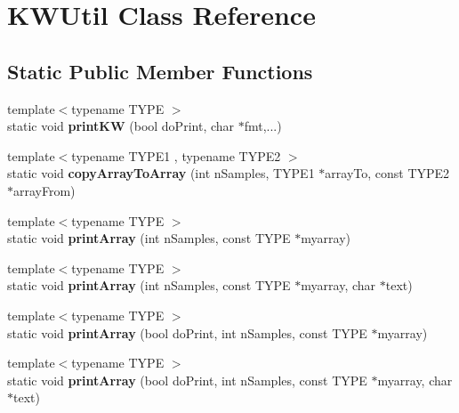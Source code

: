 \hypertarget{class_k_w_util}{\section{K\-W\-Util Class Reference}
\label{class_k_w_util}
}
\subsection*{Static Public Member Functions}
\begin{DoxyCompactItemize}
\item 
\hypertarget{class_k_w_util_a5d14be8edc626d6b30b31c8d85c64d00}{{\footnotesize template$<$typename T\-Y\-P\-E $>$ }\\static void {\bfseries print\-K\-W} (bool do\-Print, char $\ast$fmt,...)}\label{class_k_w_util_a5d14be8edc626d6b30b31c8d85c64d00}

\item 
\hypertarget{class_k_w_util_a74cbba48bf115ff4ddb90e4c8abfaaac}{{\footnotesize template$<$typename T\-Y\-P\-E1 , typename T\-Y\-P\-E2 $>$ }\\static void {\bfseries copy\-Array\-To\-Array} (int n\-Samples, T\-Y\-P\-E1 $\ast$array\-To, const T\-Y\-P\-E2 $\ast$array\-From)}\label{class_k_w_util_a74cbba48bf115ff4ddb90e4c8abfaaac}

\item 
\hypertarget{class_k_w_util_a9a809d578ed4b3647b7a92a8ee349a0e}{{\footnotesize template$<$typename T\-Y\-P\-E $>$ }\\static void {\bfseries print\-Array} (int n\-Samples, const T\-Y\-P\-E $\ast$myarray)}\label{class_k_w_util_a9a809d578ed4b3647b7a92a8ee349a0e}

\item 
\hypertarget{class_k_w_util_aa537bb86732154b9ad1317e851afccfd}{{\footnotesize template$<$typename T\-Y\-P\-E $>$ }\\static void {\bfseries print\-Array} (int n\-Samples, const T\-Y\-P\-E $\ast$myarray, char $\ast$text)}\label{class_k_w_util_aa537bb86732154b9ad1317e851afccfd}

\item 
\hypertarget{class_k_w_util_a551666cf04781258441f4d5a77c6a7d8}{{\footnotesize template$<$typename T\-Y\-P\-E $>$ }\\static void {\bfseries print\-Array} (bool do\-Print, int n\-Samples, const T\-Y\-P\-E $\ast$myarray)}\label{class_k_w_util_a551666cf04781258441f4d5a77c6a7d8}

\item 
\hypertarget{class_k_w_util_a5eafacfaa0ea74867d2b37cf22558644}{{\footnotesize template$<$typename T\-Y\-P\-E $>$ }\\static void {\bfseries print\-Array} (bool do\-Print, int n\-Samples, const T\-Y\-P\-E $\ast$myarray, char $\ast$text)}\label{class_k_w_util_a5eafacfaa0ea74867d2b37cf22558644}


\end{DoxyCompactItemize}
